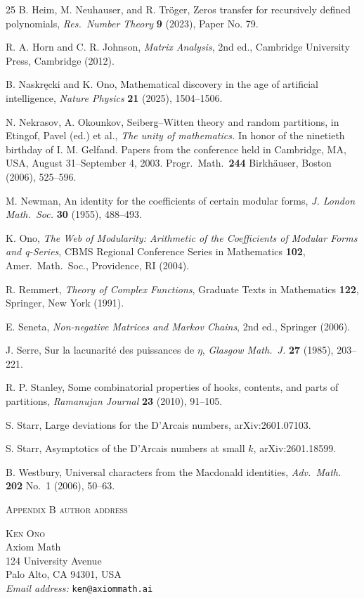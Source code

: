 \documentclass[11pt,reqno]{amsart}
\theoremstyle{plain}
\theoremstyle{remark}
\theoremstyle{definition}
\numberwithin{equation}{section}
\begin{document}
\begin{thebibliography}{25}
B. Heim, M. Neuhauser, and R. Tr\"oger,
Zeros transfer for recursively defined polynomials,
\emph{Res.\ Number Theory\/} \textbf{9} (2023), Paper No. 79.





R. A. Horn and C. R. Johnson,
\emph{Matrix Analysis\/}, 2nd ed.,
Cambridge University Press, Cambridge (2012).


B. Naskr\k{e}cki and K. Ono,
Mathematical discovery in the age of artificial intelligence,
\emph{Nature Physics\/} \textbf{21} (2025), 1504--1506.

 N. Nekrasov, A. Okounkov,
{Seiberg--Witten theory and random partitions},
in Etingof, Pavel (ed.) et al.,
{\it The unity of mathematics.\/}
In honor of the ninetieth birthday of I. M. Gelfand. Papers from the conference held in Cambridge, MA, USA, August 31--September 4, 2003.
Progr.\ Math.\ {\bf{244}} Birkh\"{a}user,
Boston (2006), 525--596.

M. Newman,
{An identity for the coefficients of certain modular forms},
\emph{J. London
Math.\ Soc.\/} \textbf{30} (1955), 488--493.

K. Ono,
\emph{The Web of Modularity: Arithmetic of the Coefficients of Modular Forms and q-Series},
CBMS Regional Conference Series in Mathematics \textbf{102}, Amer.\ Math.\ Soc., Providence, RI
(2004).

R. Remmert,
\emph{Theory of Complex Functions\/},
Graduate Texts in Mathematics
\textbf{122},
Springer, New York (1991).


E. Seneta,
\emph{Non-negative Matrices and Markov Chains\/}, 2nd ed.,
Springer (2006).

J. Serre,
{Sur la lacunarit\'{e} des puissances de $\eta $},
\emph{Glasgow Math.\ J.\/} \textbf{27} (1985), 203--221.

R. P. Stanley,
{Some combinatorial properties of hooks, contents, and parts of partitions},
\emph{Ramanujan Journal\/} \textbf{23} (2010), 91--105.

S. Starr,
Large deviations for the D'Arcais numbers,
arXiv:2601.07103.

S. Starr,
Asymptotics of the D'Arcais numbers at small $k$,
arXiv:2601.18599.

B. Westbury,
{Universal characters from the Macdonald identities},
\emph{Adv.\ Math.\/} \textbf{202}
No.\ 1 (2006), 50--63.

\end{thebibliography}

\clearpage
\noindent\textsc{Appendix B author address}

\medskip
\noindent
\textsc{Ken Ono}\\
Axiom Math\\
124 University Avenue\\
Palo Alto, CA 94301, USA\\
\emph{Email address:} \texttt{ken@axiommath.ai}
\end{document}
